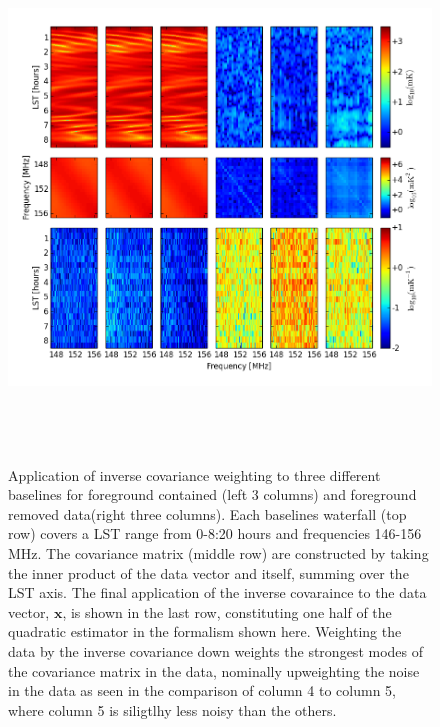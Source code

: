 \documentclass[twocolumn,numberedappendix]{emulateapj} \shorttitle{PSA64}
\newcommand{\x}{\mathbf{x}} \newcommand{\xhat}{\hat{\mathbf{x}}}
\begin{document}
\begin{figure}[h!]\centering
\includegraphics[width=2\columnwidth, height=5.5in]{plots/inv_cov.png}
\caption{Application of inverse covariance weighting to three different
baselines for foreground contained (left 3 columns) and foreground removed
data(right three columns). Each baselines waterfall (top row) covers a LST range
from 0-8:20 hours and frequencies 146-156 MHz. The covariance matrix (middle
row) are constructed by taking the inner product of the data vector and itself,
summing over the LST axis. The final application of the inverse covaraince to
the data vector, $\x$, is shown in the last row, constituting one half of the
quadratic estimator in the formalism shown here. Weighting the data by the
inverse covariance down weights the strongest modes of the covariance matrix in
the data, nominally upweighting the noise in the data as seen in the comparison
of column 4 to column 5, where column 5 is siligtlhy less noisy than the others.} 
\label{fig:inv_cov}
\end{figure}
\end{document}
